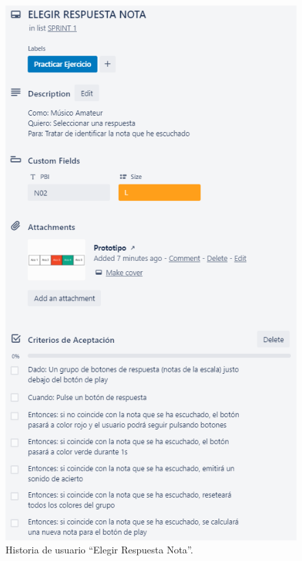 \documentclass[12pt,twoside,titlepage]{report}
\begin{document}
{\begin{figure}[H]
    \centering
    \includegraphics[scale=1.3]{Scrum/User Stories/NotasRespuestas}
    \caption{Historia de usuario ``Elegir Respuesta Nota''.}
    \label{fig:NotasRespuestas}
\end{figure}

}
\end{document}
